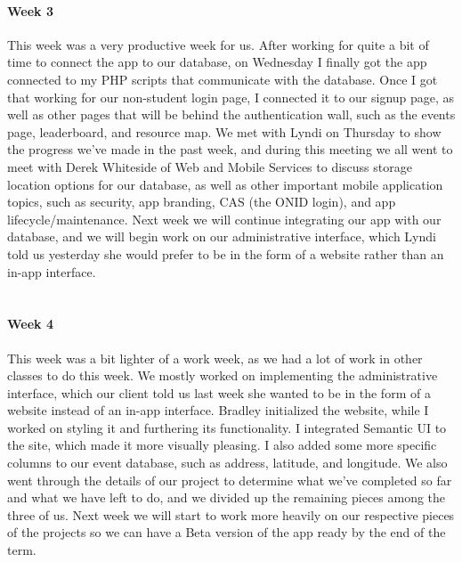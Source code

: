 \documentclass[onecolumn, draftclsnofoot,10pt, compsoc]{IEEEtran}
\begin{document}
      \paragraph{Week 3}
      This week was a very productive week for us. After working for quite a bit of time to connect the app to our database, on Wednesday I finally got the app connected to my PHP scripts that communicate with the database. Once I got that working for our non-student login page, I connected it to our signup page, as well as other pages that will be behind the authentication wall, such as the events page, leaderboard, and resource map. We met with Lyndi on Thursday to show the progress we've made in the past week, and during this meeting we all went to meet with Derek Whiteside of Web and Mobile Services to discuss storage location options for our database, as well as other important mobile application topics, such as security, app branding, CAS (the ONID login), and app lifecycle/maintenance. Next week we will continue integrating our app with our database, and we will begin work on our administrative interface, which Lyndi told us yesterday she would prefer to be in the form of a website rather than an in-app interface. \\ \\

      \paragraph{Week 4}
      This week was a bit lighter of a work week, as we had a lot of work in other classes to do this week. We mostly worked on implementing the administrative interface, which our client told us last week she wanted to be in the form of a website instead of an in-app interface. Bradley initialized the website, while I worked on styling it and furthering its functionality. I integrated Semantic UI to the site, which made it more visually pleasing. I also added some more specific columns to our event database, such as address, latitude, and longitude. We also went through the details of our project to determine what we’ve completed so far and what we have left to do, and we divided up the remaining pieces among the three of us. Next week we will start to work more heavily on our respective pieces of the projects so we can have a Beta version of the app ready by the end of the term. \\ \\
\end{document}
